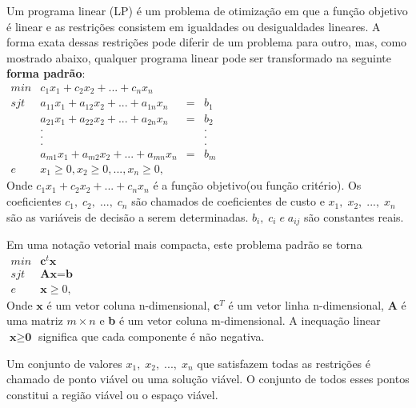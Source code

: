 \documentclass[10pt,a4paper,oneside]{article}
\begin{document}
Um programa linear (LP) é um problema de otimização em que a função objetivo é linear e as restrições consistem em igualdades ou desigualdades lineares. A forma exata dessas restrições pode diferir de um problema para outro, mas, como mostrado abaixo, qualquer programa linear pode ser transformado na seguinte \textbf{forma padrão}:\\

$\begin{array}{rlcl}
min & c_{1}x_{1} + c_{2}x_{2} + ... +  c_{n}x_{n}\\
sjt & a_{11}x_{1} + a_{12}x_{2} + ... +  a_{1n}x_{n} & = & b_{1}\\
	& a_{21}x_{1} + a_{22}x_{2} + ... +  a_{2n}x_{n} & = & b_{2}\\
	& .                                              &   & .    \\
	& .                                              &   & .    \\
	& .                                              &   & .    \\
	& a_{m1}x_{1} + a_{m2}x_{2} + ... +  a_{mn}x_{n} & = & b_{m}\\
e   & x_{1} \geq 0, x_{2} \geq 0, ..., x_{n} \geq 0,
\end{array}$ \\

Onde $c_{1}x_{1} + c_{2}x_{2} + ... +  c_{n}x_{n}$ é a função objetivo(ou função critério). Os coeficientes $c_{1},\;c_{2},\;...,\;c_{n}$ são chamados de coeficientes de custo e $x_{1},\;x_{2},\;...,\;x_{n}$ são as variáveis de decisão a serem determinadas.
$b_{i},\; c_{i} \; e\; a_{ij}$ são constantes reais.

Em uma notação vetorial mais compacta, este problema padrão se torna\\

$\begin{array}{rlcl}
min & \textbf{c}^{t}\textbf{x}\\
sjt & \textbf{Ax} = \textbf{b}\\
e   & \textbf{x} \geq 0,
\end{array}$\\

Onde $\textbf{x}$ é um vetor coluna n-dimensional, $\textbf{c}^{T}$ é um vetor linha n-dimensional, \textbf{A} é uma matriz $m \times n$ e \textbf{b} é um vetor coluna m-dimensional. A inequação linear $\textbf{x} \geq \textbf{0}$ significa que cada componente é não negativa.

Um conjunto de valores $x_{1},\;x_{2},\;...,\;x_{n}$ que satisfazem todas as restrições é chamado de ponto viável ou uma solução viável. O conjunto de todos esses pontos constitui a região viável ou o espaço viável.
\end{document}
